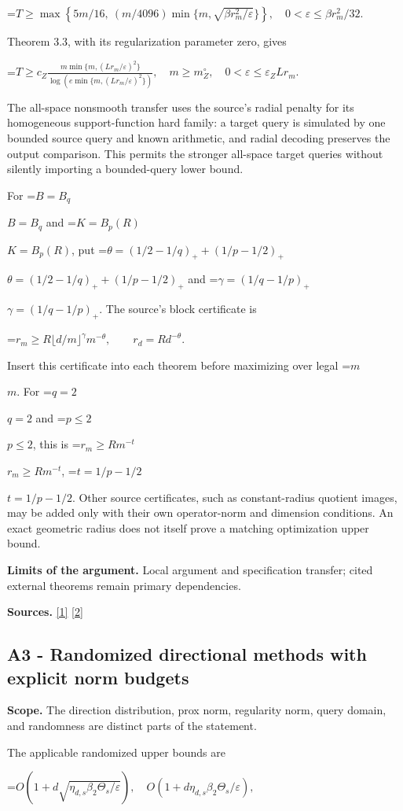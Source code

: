 \documentclass[10pt,a4paper]{article}
\newcommand{\AtlasMath}[1]{\par\begingroup\centering\setbox0=\hbox{$\displaystyle #1$}\ifdim\wd0>1.4\linewidth\typeout{ATLAS WIDE FORMULA: \the\wd0}\fi\ifdim\wd0>\linewidth\resizebox{\linewidth}{!}{\box0}\else\box0\fi\par\endgroup}
\newcommand{\AtlasInlineMath}[1]{\begingroup\setbox0=\hbox{$#1$}\ifdim\wd0>.4\linewidth\endgroup\AtlasMath{#1}\else\endgroup$#1$\fi}
\begin{document}
\AtlasMath{T\ge\max\left\{5m/16,\ (m/4096)\min\{m,\sqrt{\beta r_m^2/\varepsilon}\}\right\},\quad0<\varepsilon\le\beta r_m^2/32.}

Theorem 3.3, with its regularization parameter zero, gives

\AtlasMath{T\ge c_Z\frac{m\min\{m,(Lr_m/\varepsilon)^2\}}{\log(e\min\{m,(Lr_m/\varepsilon)^2\})},\quad m\ge m_Z^\circ,\quad0<\varepsilon\le\varepsilon_ZLr_m.}

The all-space nonsmooth transfer uses the source's radial penalty for its homogeneous support-function hard family: a target query is simulated by one bounded source query and known arithmetic, and radial decoding preserves the output comparison. This permits the stronger all-space target queries without silently importing a bounded-query lower bound.

For \AtlasInlineMath{B=B_q} and \AtlasInlineMath{K=B_p(R)}, put \AtlasInlineMath{\theta=(1/2-1/q)_++(1/p-1/2)_+} and \AtlasInlineMath{\gamma=(1/q-1/p)_+}. The source's block certificate is

\AtlasMath{r_m\ge R\lfloor d/m\rfloor^\gamma m^{-\theta},\qquad r_d=Rd^{-\theta}.}

Insert this certificate into each theorem before maximizing over legal \AtlasInlineMath{m}. For \AtlasInlineMath{q=2} and \AtlasInlineMath{p\le2}, this is \AtlasInlineMath{r_m\ge Rm^{-t}}, \AtlasInlineMath{t=1/p-1/2}. Other source certificates, such as constant-radius quotient images, may be added only with their own operator-norm and dimension conditions. An exact geometric radius does not itself prove a matching optimization upper bound.

\textbf{Limits of the argument.} Local argument and specification transfer; cited external theorems remain primary dependencies.

\textbf{Sources.} \href{https://arxiv.org/html/2610.00345v1}{[1]} \href{https://arxiv.org/html/2607.16558v2}{[2]}

\subsection{A3 - Randomized directional methods with explicit norm budgets}
\textbf{Scope.} The direction distribution, prox norm, regularity norm, query domain, and randomness are distinct parts of the statement.

The applicable randomized upper bounds are

\AtlasMath{O(1+d\sqrt{\eta_{d,s}\beta_2\Theta_s/\varepsilon}),\quad O(1+d\eta_{d,s}\beta_2\Theta_s/\varepsilon),}
\end{document}
